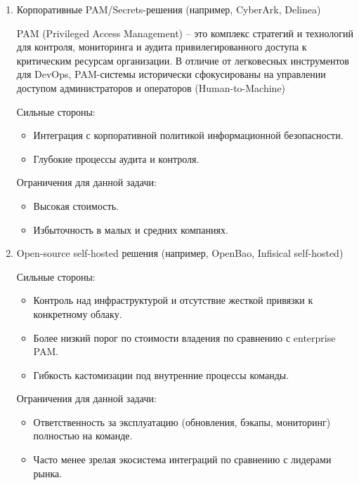 \documentclass[14pt, a4paper]{extarticle}
\begin{document}
\begin{enumerate}
	Ограничения для данной задачи:
	
	\begin{itemize}
	\item Привязка к конкретному облачному провайдеру.
	\item Зависимость от внешней инфраструктуры.
	\end{itemize}
	
	\item Корпоративные PAM/Secrets-решения (например, CyberArk, Delinea)
	
	PAM (Privileged Access Management) -- это комплекс стратегий и технологий для контроля, мониторинга и аудита привилегированного доступа к критическим ресурсам организации. В отличие от легковесных инструментов для DevOps, PAM-системы исторически сфокусированы на управлении доступом администраторов и операторов (Human-to-Machine)

	Сильные стороны:
	
	\begin{itemize}
	\item Интеграция с корпоративной политикой информационной безопасности.
	\item Глубокие процессы аудита и контроля.
	\end{itemize}
	
	Ограничения для данной задачи:
	
	\begin{itemize}
	\item Высокая стоимость.
	\item Избыточность в малых и средних компаниях.
	\end{itemize}
	
	\item Open-source self-hosted решения (например, OpenBao, Infisical self-hosted)
	
	Сильные стороны:
	
	\begin{itemize}
	\item Контроль над инфраструктурой и отсутствие жесткой привязки к конкретному облаку.
	\item Более низкий порог по стоимости владения по сравнению с enterprise PAM.
	\item Гибкость кастомизации под внутренние процессы команды.
	\end{itemize}
	
	Ограничения для данной задачи:
	
	\begin{itemize}
	\item Ответственность за эксплуатацию (обновления, бэкапы, мониторинг) полностью на команде.
	\item Часто менее зрелая экосистема интеграций по сравнению с лидерами рынка.
	\end{itemize}
	

\end{enumerate}
\end{document}
